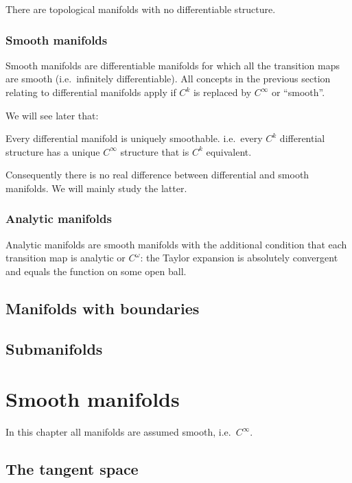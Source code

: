 There are topological manifolds with no differentiable structure.

\subsection{Smooth manifolds}
Smooth manifolds are differentiable manifolds for which all the transition maps are smooth (i.e.\ infinitely differentiable). All concepts in the previous section relating to differential manifolds apply if $C^k$ is replaced by $C^\infty$ or ``smooth''.

We will see later that:
\begin{proposition}
Every differential manifold is uniquely smoothable. i.e.\ every $C^k$ differential structure has a unique $C^\infty$ structure that is $C^k$ equivalent.
\end{proposition}
Consequently there is no real difference between differential and smooth manifolds. We will mainly study the latter.


\subsection{Analytic manifolds}
Analytic manifolds are smooth manifolds with the additional condition that each transition map is analytic or $C^\omega$: the Taylor expansion is absolutely convergent and equals the function on some open ball.

\section{Manifolds with boundaries}

\section{Submanifolds}




\chapter{Smooth manifolds}
In this chapter all manifolds are assumed smooth, i.e.\ $C^\infty$.
\section{The tangent space}
